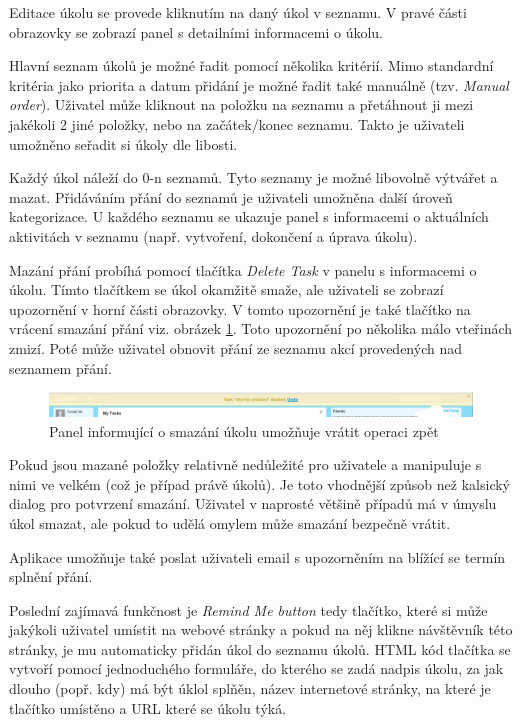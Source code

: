 Editace úkolu se provede kliknutím na daný úkol v seznamu. V pravé části obrazovky se zobrazí panel s detailními informacemi o úkolu.

Hlavní seznam úkolů je možné řadit pomocí několika kritérií. Mimo standardní kritéria jako priorita a datum přidání je možné řadit také manuálně (tzv. \emph{Manual order}). Uživatel může kliknout na položku na seznamu a přetáhnout ji mezi jakékoli 2 jiné položky, nebo na začátek/konec seznamu. Takto je uživateli umožněno seřadit si úkoly dle libosti.

Každý úkol náleží do 0-n seznamů. Tyto seznamy je možné libovolně výtvářet a mazat. Přidáváním přání do seznamů je uživateli umožněna další úroveň kategorizace. U každého seznamu se ukazuje panel s informacemi o aktuálních aktivitách v seznamu (např. vytvoření, dokončení a úprava úkolu).

Mazání přání probíhá pomocí tlačítka \emph{Delete Task} v panelu s informacemi o úkolu. Tímto tlačítkem se úkol okamžitě smaže, ale uživateli se zobrazí upozornění v horní části obrazovky. V tomto upozornění je také tlačítko na vrácení smazání přání viz. obrázek \ref{fig:astrid-undo}. Toto upozornění po několika málo vteřinách zmizí. Poté může uživatel obnovit přání ze seznamu akcí provedených nad seznamem přání.

\begin{figure}[htb]
\begin{center}
\includegraphics[width=130mm]{./pictures/astrid-undo.png}
\caption{Panel informující o smazání úkolu umožňuje vrátit operaci zpět}
\label{fig:astrid-undo}
\end{center}
\end{figure}


Pokud jsou mazané položky relativně nedůležité pro uživatele a manipuluje s nimi ve velkém (což je případ právě úkolů). Je toto vhodnější způsob než kalsický dialog pro potvrzení smazání. Uživatel v naprosté většině případů má v úmyslu úkol smazat, ale pokud to udělá omylem může smazání bezpečně vrátit. 

Aplikace umožňuje také poslat uživateli email s upozorněním na blížící se termín splnění přání.

Poslední zajímavá funkčnost je \emph{Remind Me button} tedy tlačítko, které si může jakýkoli uživatel umístit na webové stránky a pokud na něj klikne návštěvník této stránky, je mu automaticky přidán úkol do seznamu úkolů. HTML kód tlačítka se vytvoří pomocí jednoduchého formuláře, do kterého se zadá nadpis úkolu, za jak dlouho (popř. kdy) má být úklol splňěn, název internetové stránky, na které je tlačítko umístěno a URL které se úkolu týká.

